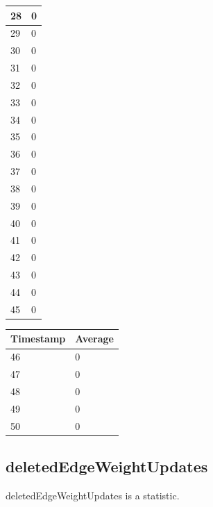 \begin{tabular}{|l||l|}
	28 & 0 \\ \hline
	29 & 0 \\ \hline
	30 & 0 \\ \hline
	31 & 0 \\ \hline
	32 & 0 \\ \hline
	33 & 0 \\ \hline
	34 & 0 \\ \hline
	35 & 0 \\ \hline
	36 & 0 \\ \hline
	37 & 0 \\ \hline
	38 & 0 \\ \hline
	39 & 0 \\ \hline
	40 & 0 \\ \hline
	41 & 0 \\ \hline
	42 & 0 \\ \hline
	43 & 0 \\ \hline
	44 & 0 \\ \hline
	45 & 0 \\ \hline
\end{tabular}
\begin{tabular}{|l||l|}
\hline
	\textbf{Timestamp} & \textbf{Average} \\ \hline
	46 & 0 \\ \hline
	47 & 0 \\ \hline
	48 & 0 \\ \hline
	49 & 0 \\ \hline
	50 & 0 \\ \hline
\end{tabular}

\subsection{deletedEdgeWeightUpdates}
deletedEdgeWeightUpdates is a statistic.

